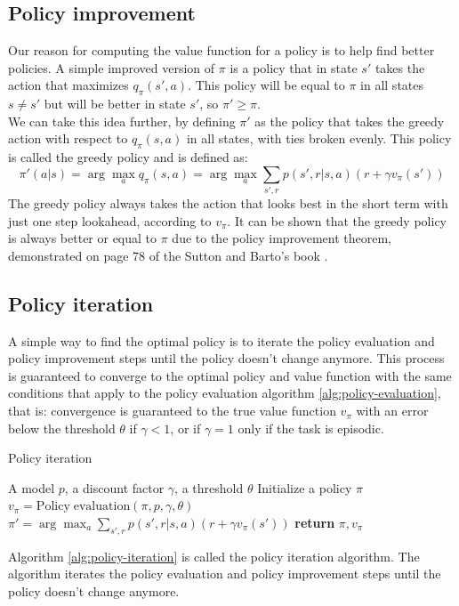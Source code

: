 \subsection{Policy improvement}
Our reason for computing the value function for a policy is to help find better policies. A simple improved version of $\pi$ is a policy that in state $s'$ takes the action that maximizes $q_{\pi}(s', a)$. This policy will be equal to $\pi$ in all states $s \neq s'$ but will be better in state $s'$, so $\pi' \geq \pi$.\\
We can take this idea further, by defining $\pi'$ as the policy that takes the greedy action with respect to $q_{\pi}(s, a)$ in all states, with ties broken evenly. This policy is called the greedy policy and is defined as:
\begin{equation}
    \pi'(a | s) = \arg \max_a q_{\pi}(s, a) = \arg \max_a \sum_{s', r} p(s', r | s, a) (r + \gamma v_{\pi}(s'))
    \label{greedy-policy}
\end{equation}
The greedy policy always takes the action that looks best in the short term with just one step lookahead, according to $v_{\pi}$. It can be shown that the greedy policy is always better or equal to $\pi$ due to the policy improvement theorem, demonstrated on page 78 of the Sutton and Barto's book \cite{sutton-barto}.

\subsection{Policy iteration}
A simple way to find the optimal policy is to iterate the policy evaluation and policy improvement steps until the policy doesn't change anymore. This process is guaranteed to converge to the optimal policy and value function with the same conditions that apply to the policy evaluation algorithm \ref{alg:policy-evaluation}, that is: convergence is guaranteed to the true value function $v_{\pi}$ with an error below the threshold $\theta$ if $\gamma < 1$, or if $\gamma = 1$ only if the task is episodic.
\begin{algorithm}[H]
    \caption{Policy iteration}
    \label{alg:policy-iteration}
    \begin{algorithmic}[1]
        \Require A model $p$, a discount factor $\gamma$, a threshold $\theta$
        \State Initialize a policy $\pi$
            \State $v_{\pi} = \mathrm{Policy \; evaluation} (\pi, p, \gamma, \theta)$ 
            \State $\pi' = \arg \max_a \sum_{s', r} p(s', r | s, a) (r + \gamma v_{\pi}(s'))$ 
                \State \textbf{return} $\pi, v_{\pi}$
            \EndIf
        \EndWhile
    \end{algorithmic}
\end{algorithm}
Algorithm \ref{alg:policy-iteration} is called the policy iteration algorithm. The algorithm iterates the policy evaluation and policy improvement steps until the policy doesn't change anymore.

